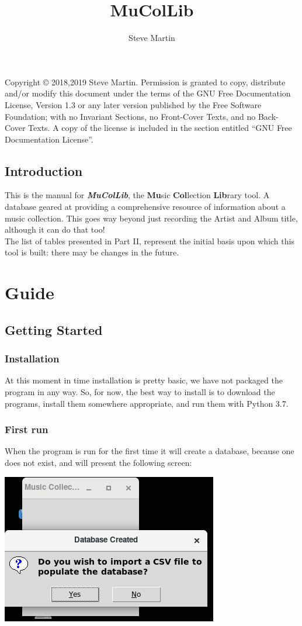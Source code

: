 \documentclass[12pt,a4paper,final,twoside,titlepage]{book}
\author{\LARGE Steve Martin}
\title{\Huge MuColLib}
\begin{document}
\maketitle
\null
\vfill
Copyright \copyright{}  2018,2019  Steve Martin.
Permission is granted to copy, distribute and/or modify this document
under the terms of the GNU Free Documentation License, Version 1.3
or any later version published by the Free Software Foundation;
with no Invariant Sections, no Front-Cover Texts, and no Back-Cover Texts.
A copy of the license is included in the section entitled ``GNU
Free Documentation License''.
\frontmatter
\tableofcontents
\newpage
\chapter{Introduction}
This is the manual for \textbf{\textit{MuColLib}}, the \textbf{Mu}sic \textbf{Col}lection \textbf{Lib}rary tool. A database geared at providing a comprehensive resource of information about a music collection.  This goes way beyond just recording the Artist and Album title, although it can do that too!
\\

The list of tables presented in Part II, represent the initial basis upon which this tool is built: there may be changes in the future.
 
\mainmatter
\part{Guide}
\chapter{Getting Started}
\section{Installation}
At this moment in time installation is pretty basic, we have not packaged the program in any way.  So, for now, the best way to install is to download the programs, install them somewhere appropriate, and run them with Python 3.7.
\pagebreak 
\section{First run}
When the program is run for the first time it will create a database, because one does not exist, and will present the following screen:

\includegraphics[scale=1]{Images/firstRun.png}
\end{document}
